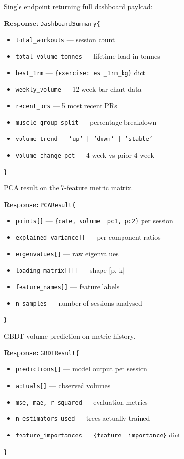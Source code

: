 \documentclass[12pt,a4paper]{report}
\begin{document}
\begin{apibox}
Single endpoint returning full dashboard payload:

\textbf{Response:} \texttt{DashboardSummary\{}
\begin{itemize}
  \item \texttt{total\_workouts} — session count
  \item \texttt{total\_volume\_tonnes} — lifetime load in tonnes
  \item \texttt{best\_1rm} — \texttt{\{exercise: est\_1rm\_kg\}} dict
  \item \texttt{weekly\_volume} — 12-week bar chart data
  \item \texttt{recent\_prs} — 5 most recent PRs
  \item \texttt{muscle\_group\_split} — percentage breakdown
  \item \texttt{volume\_trend} — \texttt{'up' | 'down' | 'stable'}
  \item \texttt{volume\_change\_pct} — 4-week vs prior 4-week
\end{itemize}
\texttt{\}}
\end{apibox}

\begin{apibox}[GET /api/analytics/users/\{user\_id\}/pca?n\_components=2]
PCA result on the 7-feature metric matrix.

\textbf{Response:} \texttt{PCAResult\{}
\begin{itemize}
  \item \texttt{points[]} — \texttt{\{date, volume, pc1, pc2\}} per session
  \item \texttt{explained\_variance[]} — per-component ratios
  \item \texttt{eigenvalues[]} — raw eigenvalues
  \item \texttt{loading\_matrix[][]} — shape [p, k]
  \item \texttt{feature\_names[]} — feature labels
  \item \texttt{n\_samples} — number of sessions analysed
\end{itemize}
\texttt{\}}
\end{apibox}

\begin{apibox}
GBDT volume prediction on metric history.

\textbf{Response:} \texttt{GBDTResult\{}
\begin{itemize}
  \item \texttt{predictions[]} — model output per session
  \item \texttt{actuals[]} — observed volumes
  \item \texttt{mse, mae, r\_squared} — evaluation metrics
  \item \texttt{n\_estimators\_used} — trees actually trained
  \item \texttt{feature\_importances} — \texttt{\{feature: importance\}} dict
\end{itemize}
\texttt{\}}
\end{apibox}
\end{document}
